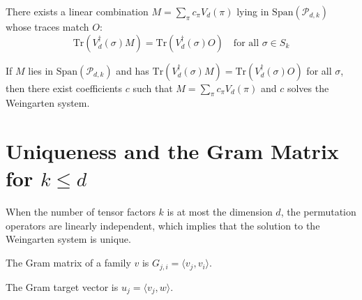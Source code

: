 \begin{theorem}\label{thm:weingarten_moment_operator_spec}
  \leanok
  There exists a linear combination $M = \sum_{\pi} c_\pi V_d(\pi)$ lying in $\text{Span}(\mathcal{P}_{d,k})$ whose traces match $O$:
  \begin{equation}
    \text{Tr}(V_d^\dagger(\sigma) M) = \text{Tr}(V_d^\dagger(\sigma) O) \quad \text{for all } \sigma \in S_k
  \end{equation}
\end{theorem}

{\chat
\begin{theorem}\label{thm:weingarten_moment_decomposition_of_props}
  \leanok
  If $M$ lies in $\text{Span}(\mathcal{P}_{d,k})$ and has $\text{Tr}(V_d^\dagger(\sigma) M) = \text{Tr}(V_d^\dagger(\sigma) O)$ for all $\sigma$, then there exist coefficients $c$ such that $M=\sum_\pi c_\pi V_d(\pi)$ and $c$ solves the Weingarten system.
\end{theorem}
} %


\section{Uniqueness and the Gram Matrix for \texorpdfstring{$k \le d$}{k <= d}}

When the number of tensor factors $k$ is at most the dimension $d$, the permutation operators are linearly independent, which implies that the solution to the Weingarten system is unique.

\begin{definition}\label{def:gramMatrix}
  \leanok
  The Gram matrix of a family $v$ is $G_{j, i} = \langle v_j, v_i \rangle$.
\end{definition}

\begin{definition}\label{def:gramVec}
  \leanok
  The Gram target vector is $u_j = \langle v_j, w \rangle$.
\end{definition}

